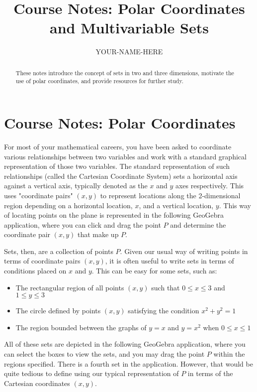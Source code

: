 \documentclass{ximera}
\title{Course Notes: Polar Coordinates and Multivariable Sets}
\author{YOUR-NAME-HERE}
\begin{document}
\begin{abstract}
These notes introduce the concept of sets in two and three dimensions, motivate the use of polar coordinates, and provide resources for further study.
\end{abstract}
\maketitle

\section{Course Notes: Polar Coordinates}

For most of your mathematical careers, you have been asked to coordinate various relationships between two variables and work with a standard graphical representation of those two variables. The standard representation of such relationships (called the Cartesian Coordinate System) sets a horizontal axis against a vertical axis, typically denoted as the $x$ and $y$ axes respectively. This uses "coordinate pairs" $(x,y)$ to represent locations along the 2-dimensional region depending on a horizontal location, $x$, and a vertical location, $y$. This way of locating points on the plane is represented in the following GeoGebra application, where you can click and drag the point $P$ and determine the coordinate pair $(x,y)$ that make up $P$.

\begin{center}
\end{center}

Sets, then, are a collection of points $P$. Given our usual way of writing points in terms of coordinate pairs $(x,y)$, it is often useful to write sets in terms of conditions placed on $x$ and $y$. This can be easy for some sets, such as:
\begin{itemize}
    \item The rectangular region of all points $(x,y)$ such that $0 \leq x \leq 3$ and $1 \leq y \leq 3$
    \item The circle defined by points $(x,y)$ satisfying the condition $x^2 + y^2 = 1$
    \item The region bounded between the graphs of $y = x$ and $y = x^2$ when $0 \leq x \leq 1$
\end{itemize}

All of these sets are depicted in the following GeoGebra application, where you can select the boxes to view the sets, and you may drag the point $P$ within the regions specified. There is a fourth set in the application. However, that would be quite tedious to define using our typical representation of $P$ in terms of the Cartesian coordinates $(x,y)$.
\end{document}
